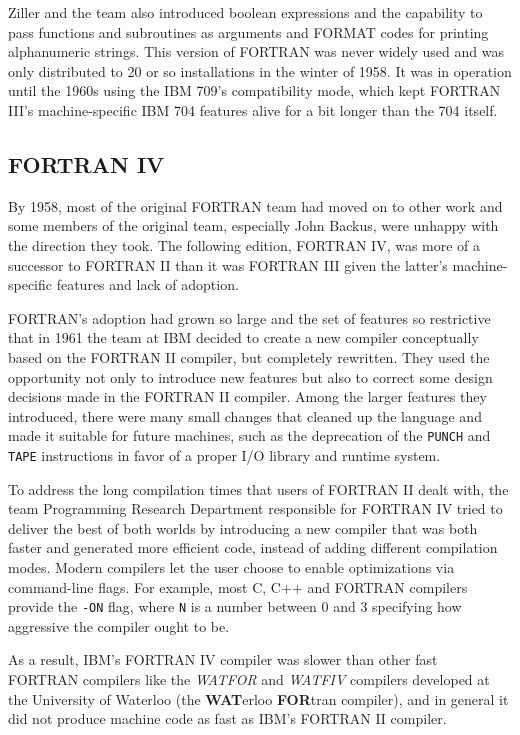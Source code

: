 Ziller and the team also introduced boolean expressions and the capability to
pass functions and subroutines as arguments and FORMAT codes for printing
alphanumeric strings.
This version of FORTRAN was never widely used and was only distributed to
20 or so installations in the winter of 1958.
It was in operation until the 1960s using the IBM 709's compatibility mode,
which kept FORTRAN III's machine-specific IBM 704 features alive for a bit longer
than the 704 itself.

\subsection{FORTRAN IV}

By 1958, most of the original FORTRAN team had moved on to other work and
some members of the original team, especially John Backus, were unhappy with
the direction they took.
The following edition, FORTRAN IV, was more of a successor to FORTRAN II than
it was FORTRAN III given the latter's machine-specific features and
lack of adoption.

FORTRAN's adoption had grown so large and the set of features so restrictive
that in 1961 the team at IBM decided to create a new compiler conceptually
based on the FORTRAN II compiler, but completely rewritten.
They used the opportunity not only to introduce new features but also to
correct some design decisions made in the FORTRAN II compiler.
Among the larger features they introduced, there were many small changes that
cleaned up the language and made it suitable for future machines,
such as the deprecation of the \texttt{PUNCH} and \texttt{TAPE}
instructions in favor of a proper I/O library and runtime system.

To address the long compilation times that users of FORTRAN II dealt with,
the team Programming Research Department responsible for FORTRAN IV
tried to deliver the best of both worlds by introducing a new compiler
that was both faster and generated more efficient code, instead of adding
different compilation modes. Modern compilers let the user choose to enable
optimizations via command-line flags. For example, most C, C++ and FORTRAN compilers
provide the \texttt{-ON} flag, where \texttt{N} is a number
between 0 and 3 specifying how aggressive the compiler ought to be.

As a result, IBM's FORTRAN IV compiler was slower than other fast FORTRAN compilers
like the \textit{WATFOR} and \textit{WATFIV} compilers developed at the University of Waterloo
(the \textbf{WAT}erloo \textbf{FOR}tran compiler\cite{cress_dirksen_graham_watfor_fortran_iv_1970}),
and in general it did not produce machine code as fast as IBM's FORTRAN II compiler.

